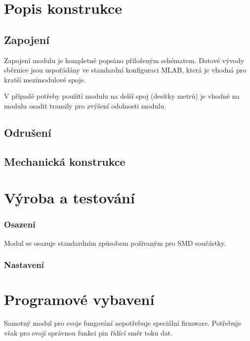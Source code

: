 \documentclass[12pt,a4paper,twoside]{article}
\begin{document}
\newpage
\section{Popis konstrukce}

\subsection{Zapojení}

Zapojení modulu je kompletně popsáno přiloženým schématem. Datové vývody sběrnice jsou uspořádány ve standardní konfiguraci MLAB, která je vhodná pro kratší mezimodulové spoje. 

V případě potřeby použití modulu na delší spoj (desítky metrů) je vhodné na modulu osadit transily pro zvýšení odolnosti modulu.  



\subsection{Odrušení}

\subsection{Mechanická konstrukce}

\section{Výroba a testování}

\subsubsection{Osazení}

Modul se osazuje standardním způsobem požívaným pro SMD součástky. 

\subsubsection{Nastavení}

\section{Programové vybavení}

Samotný modul pro svoje  fungování nepotřebuje speciální firmware. Potřebuje však pro svojí správnou funkci pin řídící směr toku dat.  

\begin{thebibliography}{99}

\end{thebibliography}
\end{document}
